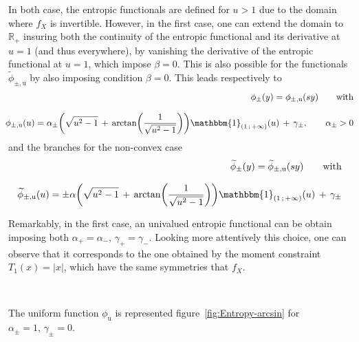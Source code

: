 \documentclass[entropy,article,submit,moreauthors,pdftex]{Definitions/mdpi}
\def\Rset{\mathbb{R}}%
\def\un{\mathbbm{1}}%
\def\u{\mathrm{u}}
\begin{document}
{In both case, the entropic functionals are defined for $u > 1$ due to the domain
where $f_X$ is invertible. However, in the first case, one can extend the domain
to $\Rset_+$  insuring both the  continuity of  the entropic functional  and its
derivative at $u = 1$ (and thus  everywhere), by vanishing the derivative of the
entropic functional at $u = 1$, which impose $\beta = 0$.  This is also possible
for  the  functionals  $\widetilde{\phi}_{\pm,\u}$ by  also  imposing  condition
$\beta = 0$.  This leads respectively to
%
\begin{eqnarray*}
  &&\hspace{-5mm}\phi_\pm(y) =  \phi_{\pm,\u}(s y) \qquad  \mbox{with} \\[2.5mm]
  &&\hspace{-5mm}\phi_{\pm,\u}(u) =  \alpha_\pm \left(  \sqrt{u^2 -  1} \,  + \,
  \arctan\left(  \frac{1}{\sqrt{u^2  -  1}}   \right)  \right)
  \un_{\left( 1 \, ; \, +\infty \right)}(u) \, + \, \gamma_\pm, \qquad \alpha_\pm > 0
\end{eqnarray*}
%
and the branches for the non-convex case
%
\begin{eqnarray*}
  &&\hspace{-5mm}\widetilde{\phi}_\pm(y) = \widetilde{\phi}_{\pm,\u}(s y) \qquad \mbox{with}
  \\[2.5mm]
  &&\hspace{-5mm}
  \widetilde{\phi}_{\pm,\u}(u) = \pm \alpha \left(  \sqrt{u^2 - 1} \, +
\, \arctan\left( \frac{1}{\sqrt{u^2 - 1}} \right)  \right) \un_{\left( 1 \, ;
  \, +\infty \right)}(u) \, + \, \gamma_\pm
\end{eqnarray*}

Remarkably, in  the first case, an  univalued entropic functional can  be obtain
imposing  both $\alpha_+  = \alpha_-,  \,  \gamma_+ =  \gamma_-$.  Looking  more
attentively this choice, one can observe that it corresponds to the one obtained
by the  moment constraint $T_1(x)  = |x|$, which  have the same  symmetries that
$f_X$.}

\

The  uniform function  $\phi_\u$ is  represented figure~\ref{fig:Entropy-arcsin}
for $\alpha_\pm = 1, \, \gamma_\pm = 0$.
 
\end{document}
